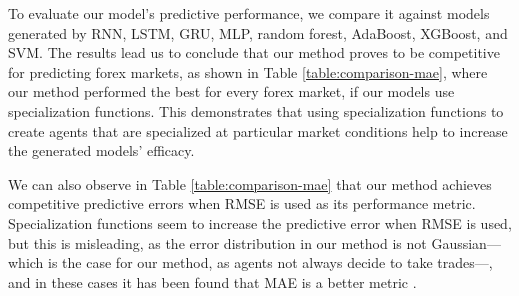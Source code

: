 \documentclass{ieeeaccess}
\begin{document}
To evaluate our model's predictive performance, we compare it against
models generated by RNN, LSTM, GRU, MLP, random forest, AdaBoost,
XGBoost, and SVM. The results lead us to conclude that our method
proves to be competitive for predicting forex markets, as shown in
Table \ref{table:comparison-mae}, where our method performed the best
for every forex market, if our models use specialization
functions. This demonstrates that using specialization functions to
create agents that are specialized at particular market conditions
help to increase the generated models' efficacy.

We can also observe in Table \ref{table:comparison-mae} that our
method achieves competitive predictive errors when RMSE is used as its
performance metric. Specialization functions seem to increase the
predictive error when RMSE is used, but this is misleading, as the
error distribution in our method is not Gaussian---which is the case
for our method, as agents not always decide to take trades---, and in
these cases it has been found that MAE is a better metric
\cite{chai2014root} \cite{willmott2005advantages}
\cite{willmott2009ambiguities}.





\end{document}
